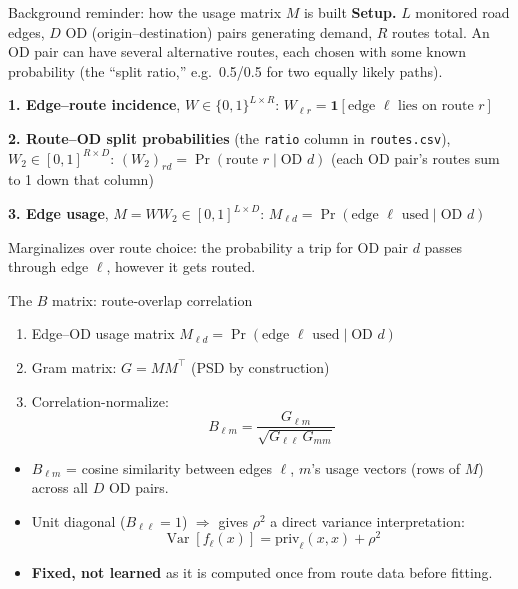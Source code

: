 \documentclass[11pt]{beamer}
\begin{document}




\begin{frame}{Background reminder: how the usage matrix $M$ is built}
\footnotesize
\textbf{Setup.} $L$ monitored road edges, $D$ OD (origin--destination)
pairs generating demand, $R$ routes total. An OD pair can have several
alternative routes, each chosen with some known probability (the
``split ratio,'' e.g.\ 0.5/0.5 for two equally likely paths).

\vspace{0.1cm}
\textbf{1. Edge--route incidence}, $W \in \{0,1\}^{L\times R}$: \quad
$W_{\ell r} = \mathbf{1}[\text{edge } \ell \text{ lies on route } r]$

\vspace{0.15cm}
\textbf{2. Route--OD split probabilities} (the \texttt{ratio} column in
\texttt{routes.csv}), $W_2 \in [0,1]^{R\times D}$:
\quad $(W_2)_{rd} = \Pr(\text{route } r \mid \text{OD } d)$
\newline \small (each OD pair's routes sum to 1 down that column) \normalsize

\vspace{0.15cm}
\textbf{3. Edge usage}, $M = W W_2 \in [0,1]^{L\times D}$: \quad
$M_{\ell d} = \Pr(\text{edge } \ell \text{ used} \mid \text{OD } d)$

\vspace{0.15cm}
Marginalizes over route choice: the probability a trip for OD pair $d$
passes through edge $\ell$, however it gets routed. 
\end{frame}



\begin{frame}{The $B$ matrix: route-overlap correlation}
\begin{enumerate}
    \item Edge--OD usage matrix $M_{\ell d} = \Pr(\text{edge }\ell\text{ used}\mid \text{OD }d)$
    \item Gram matrix: $G = M M^\top$ \quad (PSD by construction)
    \item Correlation-normalize:
    \[
        B_{\ell m} = \frac{G_{\ell m}}{\sqrt{G_{\ell\ell}\,G_{mm}}}
    \]
\end{enumerate}
\vspace{0.3cm}
\begin{itemize}
    \item $B_{\ell m}$ = cosine similarity between edges $\ell$, $m$'s
    usage vectors (rows of $M$) across all $D$ OD pairs.
    \item Unit diagonal ($B_{\ell\ell}=1$) $\Rightarrow$ gives $\rho^2$ a
    direct variance interpretation:
    \[
        \operatorname{Var}[f_\ell(x)] = \mathrm{priv}_\ell(x,x) + \rho^2
    \]
    \item \textbf{Fixed, not learned} as it is computed once from route data
    before fitting.
\end{itemize}
\end{frame}
\end{document}
